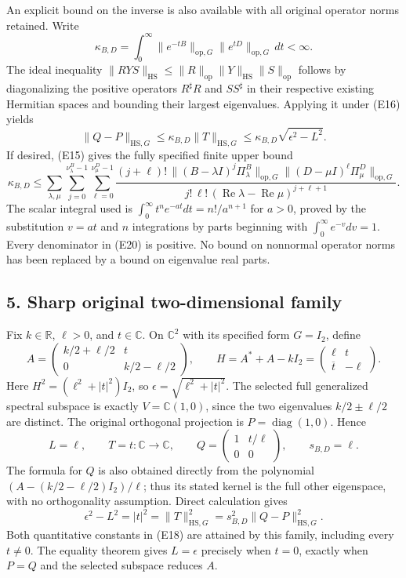 An explicit bound on the inverse is also available with all original operator norms retained. Write
\[
\kappa_{B,D}=\int_0^\infty
 \|e^{-tB}\|_{\mathrm{op},G}\|e^{tD}\|_{\mathrm{op},G}\,dt<\infty.
\]
The ideal inequality \(\|RY S\|_{\mathrm{HS}}\leq\|R\|_{\mathrm{op}}\|Y\|_{\mathrm{HS}}\|S\|_{\mathrm{op}}\) follows by diagonalizing the positive operators \(R^\sharp R\) and \(SS^\sharp\) in their respective existing Hermitian spaces and bounding their largest eigenvalues. Applying it under (E16) yields
\[
\|Q-P\|_{\mathrm{HS},G}
\leq\kappa_{B,D}\|T\|_{\mathrm{HS},G}
\leq\kappa_{B,D}\sqrt{\epsilon^2-L^2}.
\tag{E19}
\]
If desired, (E15) gives the fully specified finite upper bound
\[
\kappa_{B,D}\leq
\sum_{\lambda,\mu}
\sum_{j=0}^{\nu^B_\lambda-1}
\sum_{\ell=0}^{\nu^D_\mu-1}
\frac{(j+\ell)!\,
 \|(B-\lambda I)^j\Pi^B_\lambda\|_{\mathrm{op},G}
 \|(D-\mu I)^\ell\Pi^D_\mu\|_{\mathrm{op},G}}
{j!\,\ell!\,(\operatorname{Re}\lambda-\operatorname{Re}\mu)^{j+\ell+1}}.
\tag{E20}
\]
The scalar integral used is \(\int_0^\infty t^n e^{-at}dt=n!/a^{n+1}\) for \(a>0\), proved by the substitution \(v=at\) and \(n\) integrations by parts beginning with \(\int_0^\infty e^{-v}dv=1\). Every denominator in (E20) is positive. No bound on nonnormal operator norms has been replaced by a bound on eigenvalue real parts.

\subsection{5. Sharp original two-dimensional family}\label{sharp-original-two-dimensional-family}

Fix \(k\in\mathbb R\), \(\ell>0\), and \(t\in\mathbb C\). On \(\mathbb C^2\) with its specified form \(G=I_2\), define
\[
A=\begin{pmatrix}k/2+\ell/2&t\\0&k/2-\ell/2\end{pmatrix},
\qquad H=A^*+A-kI_2=\begin{pmatrix}\ell&t\\\overline t&-\ell\end{pmatrix}.
\tag{E21}
\]
Here \(H^2=(\ell^2+|t|^2)I_2\), so \(\epsilon=\sqrt{\ell^2+|t|^2}\). The selected full generalized spectral subspace is exactly \(V=\mathbb C(1,0)\), since the two eigenvalues \(k/2\pm\ell/2\) are distinct. The original orthogonal projection is \(P=\operatorname{diag}(1,0)\). Hence
\[
L=\ell,\qquad T=t:\mathbb C\to\mathbb C,
\qquad Q=\begin{pmatrix}1&t/\ell\\0&0\end{pmatrix},
\qquad s_{B,D}=\ell.
\tag{E22}
\]
The formula for \(Q\) is also obtained directly from the polynomial \((A-(k/2-\ell/2)I_2)/\ell\); thus its stated kernel is the full other eigenspace, with no orthogonality assumption. Direct calculation gives
\[
\epsilon^2-L^2=|t|^2
=\|T\|_{\mathrm{HS},G}^2
=s_{B,D}^2\|Q-P\|_{\mathrm{HS},G}^2.
\tag{E23}
\]
Both quantitative constants in (E18) are attained by this family, including every \(t\ne0\). The equality theorem gives \(L=\epsilon\) precisely when \(t=0\), exactly when \(P=Q\) and the selected subspace reduces \(A\).

